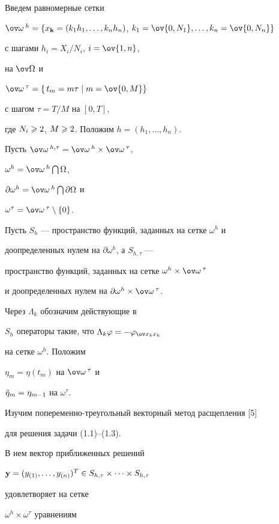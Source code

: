 Введем равномерные сетки


$\ov\omega\,^h=\{ x_{\bold k}=(k_1h_1,\dotsc,k_nh_n)$, $k_1=\ov{0, N_1},


\dotsc,k_n=\ov{0,N_n}\}$


с шагами $h_i=X_i/N_i$, $i=\ov{1,n}$,


на $\ov\Omega$ и


$\ov\omega\,^\tau=\{\, t_m=m\tau\mid m=\ov{0,M}\}$


 с шагом $\tau=T/M$ на $[0,T]$,


где $N_i\geqslant 2$, $M\geqslant 2$. Положим $h=(h_1,\dotsc,h_n)$. 


Пусть $\ov\omega\,^{h,\tau}=\ov\omega\,^h\times\ov\omega\,^\tau$,


$\omega^h=\ov\omega\,^h\bigcap\Omega$,


$\partial\omega^h=\ov\omega\,^h\bigcap\partial\Omega$ и


$\omega^\tau=\ov\omega\,^\tau\setminus\{0\}$.


Пусть $S_h$ --- пространство функций, заданных на сетке $\omega^h$ и


доопределенных нулем на $\partial\omega^h$, а $S_{h,\tau}$ --- 


пространство функций, заданных на сетке $\omega^h\times\ov\omega\,^\tau$


и доопределенных нулем на $\partial\omega^h\times\ov\omega\,^\tau$.


Через $\Lambda_k$ обозначим действующие в 


$S_h$ операторы такие, что $\Lambda_k\varphi=-\varphi_{\ov x_kx_k}$ 


на сетке $\omega^h$. Положим


$\eta_m=\eta(t_m)$ на $\ov\omega\,^\tau$ и


$\Check\eta_m=\eta_{m-1}$ на $\omega^\tau$.





Изучим попеременно-треугольный векторный метод расщепления [5]


для решения задачи (1.1)--(1.3).


В нем вектор приближенных решений


${\bold y}=(y_{(1)},\dotsc,y_{(n)})^T\in S_{h,\tau}


\times\dotsb\times S_{h,\tau}$


удовлетворяет на сетке 


$\omega^h\times\omega^\tau$ уравнениям


